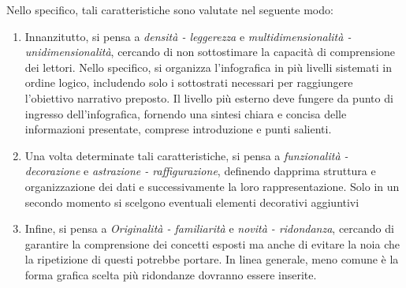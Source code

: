 \bigskip
\noindent Nello specifico, tali caratteristiche sono valutate nel seguente modo:
\begin{enumerate}
    \item Innanzitutto, si pensa a \emph{densità - leggerezza} e \emph{multidimensionalità - unidimensionalità}, cercando di non sottostimare la capacità di comprensione dei lettori.
    Nello specifico, si organizza l'infografica in più livelli sistemati in ordine logico, includendo solo i sottostrati necessari per raggiungere l'obiettivo narrativo preposto.
    Il livello più esterno deve fungere da punto di ingresso dell'infografica, fornendo una sintesi chiara e concisa delle informazioni presentate, comprese introduzione e punti salienti.
    \item Una volta determinate tali caratteristiche, si pensa a \emph{funzionalità - decorazione} e \emph{astrazione - raffigurazione}, definendo dapprima struttura e organizzazione dei dati e successivamente la loro rappresentazione. 
    Solo in un secondo momento si scelgono eventuali elementi decorativi aggiuntivi
    \item Infine, si pensa a \emph{Originalità - familiarità} e \emph{novità - ridondanza}, cercando di garantire la comprensione dei concetti esposti ma anche di evitare la noia che la ripetizione di questi potrebbe portare.
    In linea generale, meno comune è la forma grafica scelta più ridondanze dovranno essere inserite.
\end{enumerate}